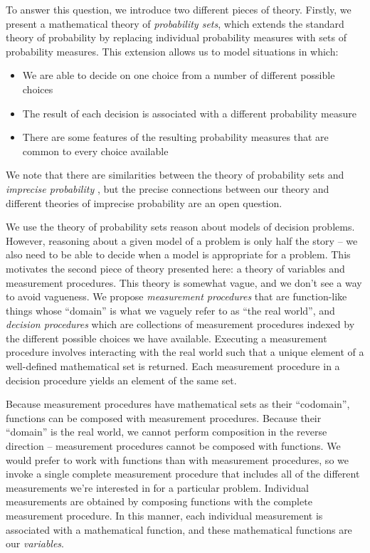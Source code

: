 \documentclass{article}
\theoremstyle{plain}
\theoremstyle{definition}
\begin{document}
To answer this question, we introduce two different pieces of theory. Firstly, we present a mathematical theory of \emph{probability sets}, which extends the standard theory of probability by replacing individual probability measures with sets of probability measures. This extension allows us to model situations in which:
\begin{itemize}
  \item We are able to decide on one choice from a number of different possible choices
  \item The result of each decision is associated with a different probability measure
  \item There are some features of the resulting probability measures that are common to every choice available
\end{itemize}
We note that there are similarities between the theory of probability sets and \emph{imprecise probability} \citep{walley_statistical_1991}, but the precise connections between our theory and different theories of imprecise probability are an open question.

We use the theory of probability sets reason about models of decision problems. However, reasoning about a given model of a problem is only half the story -- we also need to be able to decide when a model is appropriate for a problem. This motivates the second piece of theory presented here: a theory of variables and measurement procedures. This theory is somewhat vague, and we don't see a way to avoid vagueness. We propose \emph{measurement procedures} that are function-like things whose ``domain'' is what we vaguely refer to as ``the real world'', and \emph{decision procedures} which are collections of measurement procedures indexed by the different possible choices we have available. Executing a measurement procedure involves interacting with the real world such that a unique element of a well-defined mathematical set is returned. Each measurement procedure in a decision procedure yields an element of the same set. 

Because measurement procedures have mathematical sets as their ``codomain'', functions can be composed with measurement procedures. Because their ``domain'' is the real world, we cannot perform composition in the reverse direction -- measurement procedures cannot be composed with functions. We would prefer to work with functions than with measurement procedures, so we invoke a single complete measurement procedure that includes all of the different measurements we're interested in for a particular problem. Individual measurements are obtained by composing functions with the complete measurement procedure. In this manner, each individual measurement is associated with a mathematical function, and these mathematical functions are our \emph{variables}.
\end{document}
